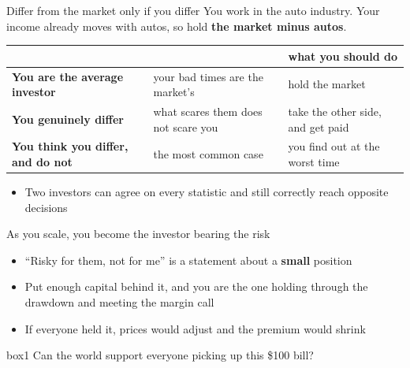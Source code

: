 \documentclass[aspectratio=169,10pt]{beamer}
\begin{document}
\begin{frame}{Differ from the market only if you differ}
You work in the auto industry. Your income already moves with autos, so hold \textbf{the market minus autos}.
\vskip 8pt
\begin{center}
\renewcommand{\arraystretch}{1.6}
\begin{tabular}{P{4.7cm} P{4.1cm} P{3.9cm}}
\toprule
 & & what you should do \\
\midrule
\textbf{You are the average investor} & your bad times are the market's & hold the market \\
\textbf{You genuinely differ} & what scares them does not scare you & take the other side, and get paid \\
\textbf{You think you differ, and do not} & the most common case & you find out at the worst time \\
\bottomrule
\end{tabular}
\end{center}
\vskip 6pt
\begin{itemize}
\item Two investors can agree on every statistic and still correctly reach opposite decisions
\end{itemize}
\end{frame}

\begin{frame}{As you scale, you become the investor bearing the risk}
\begin{itemize}
\item ``Risky for them, not for me'' is a statement about a \textbf{small} position
\vskip 12pt
\item Put enough capital behind it, and you are the one holding through the drawdown and meeting the margin call
\vskip 12pt
\item If everyone held it, prices would adjust and the premium would shrink
\end{itemize}
\vskip 16pt
\begin{beamercolorbox}[rounded=true,sep=8pt,center]{box1}
Can the world support everyone picking up this \$100 bill?
\end{beamercolorbox}
\end{frame}
\end{document}
